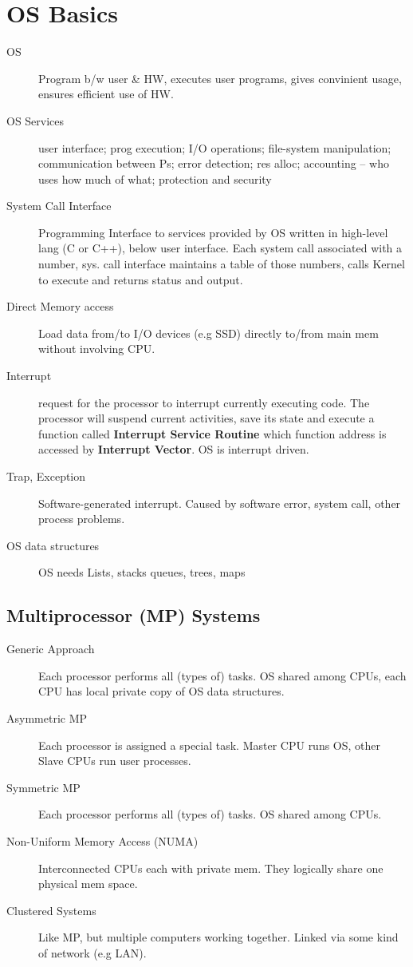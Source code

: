 \section*{OS Basics}
\begin{description}
  \item[OS] Program b/w user \& HW, executes user programs, gives convinient usage, ensures efficient use of HW.
  \item[OS Services] user interface; prog execution; I/O operations; file-system manipulation; communication between Ps; error detection; res alloc; accounting – who uses how much of what; protection and security
    \item[System Call Interface] Programming Interface to services provided by OS written in high-level lang (C or C++), below user interface. Each system call associated with a number, sys. call interface maintains a table of those numbers, calls Kernel to execute and returns status and output.
  \item[Direct Memory access] Load data from/to I/O devices (e.g SSD) directly to/from main mem without involving CPU.
  \item[Interrupt] request for the processor to interrupt currently executing code. The processor will suspend current activities, save its state and execute a function called \textbf{Interrupt Service Routine} which function address is accessed by \textbf{Interrupt Vector}. OS is interrupt driven.
  \item[Trap, Exception] Software-generated interrupt. Caused by software error, system call, other process problems.
  \item[OS data structures] OS needs Lists, stacks queues, trees, maps
\end{description}

\subsection*{Multiprocessor (MP) Systems}
\begin{description}
  \item[Generic Approach] Each processor performs all (types of) tasks. OS shared among CPUs, each CPU has local private copy of OS data structures.
  \item[Asymmetric MP] Each processor is assigned a special task. Master CPU runs OS, other Slave CPUs run user processes.
  \item[Symmetric MP] Each processor performs all (types of) tasks. OS shared among CPUs.
  \item[Non-Uniform Memory Access (NUMA)] Interconnected CPUs each with private mem. They logically share one physical mem space.
  \item[Clustered Systems] Like MP, but multiple computers working together. Linked via some kind of network (e.g LAN).
\end{description}

